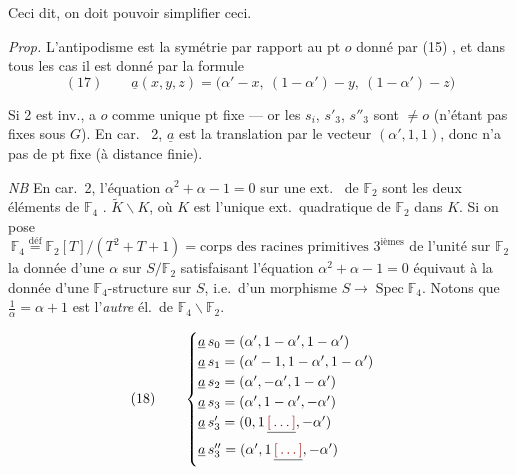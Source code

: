 \documentclass[11pt,a4paper]{article}
\begin{document}
Ceci dit, on doit pouvoir  simplifier ceci.

\emph{Prop.} L'antipodisme  est la symétrie par rapport au pt $o$ donné par (15) , et dans tous les cas il est donné par la formule
\[ (17) \qquad \underline{a}(x, y, z) = \bigl(\alpha' - x,\ (1 - \alpha') - y,\ (1 - \alpha') - z\bigr) \]

Si 2 est inv.,  \struck{\ill{}} a $o$ comme unique pt fixe --- or les $s_i$,  $s'_3$, $s''_3$ sont $\neq o$ (n'étant pas fixes sous $G$). En car.\ \struck{\ill{}} 2, $\underline{a}$ est la translation par le vecteur $(\alpha', 1, 1)$, donc n'a pas de pt fixe (à distance finie).

\emph{NB} En car.\ 2,  l'équation $\alpha^2 + \alpha - 1 = 0$ sur une ext.\  de $\mathbb{F}_2$ sont les deux éléments de \struck{\ill{}} $\mathbb{F}_4$ . $\widetilde{K} \smallsetminus K$, où $K$ est l'unique ext.\ quadratique de $\mathbb{F}_2$ dans $K$. Si on pose
\[ \mathbb{F}_4 \overset{\text{déf}}{=} \mathbb{F}_2[T]/(T^2 + T + 1) = \text{corps des racines primitives } 3^{\text{ièmes}} \text{ de l'unité sur } \mathbb{F}_2 \]
la donnée d'une $\alpha$ sur $S/\mathbb{F}_2$ \struck{\ill{}} satisfaisant l'équation $\alpha^2 + \alpha - 1 = 0$ équivaut à la donnée d'une $\mathbb{F}_4$-structure sur $S$, i.e.\ d'un morphisme $S \to \operatorname{Spec} \mathbb{F}_4$. Notons que $\frac{1}{\alpha} = \alpha + 1$ est l'\emph{autre} él.\ de $\mathbb{F}_4 \smallsetminus \mathbb{F}_2$.

\[ (18) \qquad \begin{cases}
\underline{a}\, s_0 = (\alpha', 1 - \alpha', 1 - \alpha') \\
\underline{a}\, s_1 = (\alpha' - 1, 1 - \alpha', 1 - \alpha') \\
\underline{a}\, s_2 = (\alpha', -\alpha', 1 - \alpha') \\
\underline{a}\, s_3 = (\alpha', 1 - \alpha', -\alpha') \\
\underline{a}\, s'_3 = (0, 1\,\struck{\ill{}}, -\alpha') \\
\underline{a}\, s''_3 = (\alpha', 1\,\struck{\ill{}}, -\alpha')
\end{cases} \]
\end{document}
